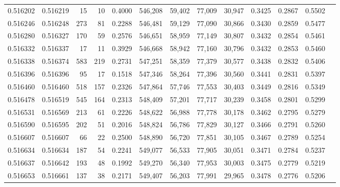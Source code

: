 \begin{tabular}{rrrrrrrrrrrrr}
0.516202 & 0.516219 &    15 &    10 &                                     0.4000 & 546,208 &  59,402 &  77,009 &  30,947 & 0.3425 & 0.2867 & 0.5502 \\
0.516246 & 0.516248 &   273 &    81 &                                     0.2288 & 546,481 &  59,129 &  77,090 &  30,866 & 0.3430 & 0.2859 & 0.5477 \\
0.516280 & 0.516327 &   170 &    59 &                                     0.2576 & 546,651 &  58,959 &  77,149 &  30,807 & 0.3432 & 0.2854 & 0.5461 \\
0.516332 & 0.516337 &    17 &    11 &                                     0.3929 & 546,668 &  58,942 &  77,160 &  30,796 & 0.3432 & 0.2853 & 0.5460 \\
0.516338 & 0.516374 &   583 &   219 &                                     0.2731 & 547,251 &  58,359 &  77,379 &  30,577 & 0.3438 & 0.2832 & 0.5406 \\
0.516396 & 0.516396 &    95 &    17 &                                     0.1518 & 547,346 &  58,264 &  77,396 &  30,560 & 0.3441 & 0.2831 & 0.5397 \\
0.516460 & 0.516460 &   518 &   157 &                                     0.2326 & 547,864 &  57,746 &  77,553 &  30,403 & 0.3449 & 0.2816 & 0.5349 \\
0.516478 & 0.516519 &   545 &   164 &                                     0.2313 & 548,409 &  57,201 &  77,717 &  30,239 & 0.3458 & 0.2801 & 0.5299 \\
0.516531 & 0.516569 &   213 &    61 &                                     0.2226 & 548,622 &  56,988 &  77,778 &  30,178 & 0.3462 & 0.2795 & 0.5279 \\
0.516590 & 0.516595 &   202 &    51 &                                     0.2016 & 548,824 &  56,786 &  77,829 &  30,127 & 0.3466 & 0.2791 & 0.5260 \\
0.516607 & 0.516607 &    66 &    22 &                                     0.2500 & 548,890 &  56,720 &  77,851 &  30,105 & 0.3467 & 0.2789 & 0.5254 \\
0.516634 & 0.516634 &   187 &    54 &                                     0.2241 & 549,077 &  56,533 &  77,905 &  30,051 & 0.3471 & 0.2784 & 0.5237 \\
0.516637 & 0.516642 &   193 &    48 &                                     0.1992 & 549,270 &  56,340 &  77,953 &  30,003 & 0.3475 & 0.2779 & 0.5219 \\
0.516653 & 0.516661 &   137 &    38 &                                     0.2171 & 549,407 &  56,203 &  77,991 &  29,965 & 0.3478 & 0.2776 & 0.5206 \\

\end{tabular}
